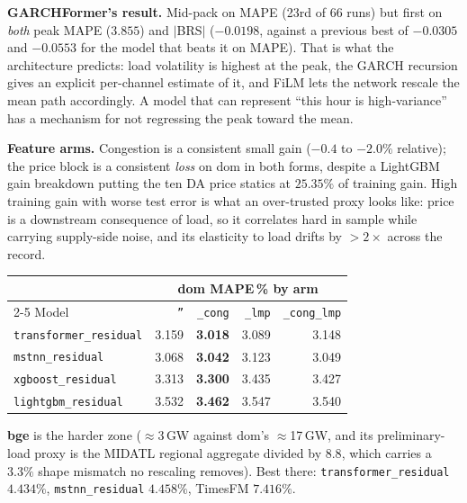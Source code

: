 \documentclass[11pt]{article}
\newcommand{\code}[1]{\texttt{\small #1}}
\begin{document}
\noindent
\textbf{GARCHFormer's result.} Mid-pack on MAPE (23rd of 66 runs) but first on
\emph{both} peak MAPE ($3.855$) and $|$BRS$|$ ($-0.0198$, against a previous best of
$-0.0305$ and $-0.0553$ for the model that beats it on MAPE). That is what the
architecture predicts: load volatility is highest at the peak, the GARCH recursion
gives an explicit per-channel estimate of it, and FiLM lets the network rescale the
mean path accordingly. A model that can represent ``this hour is high-variance'' has
a mechanism for not regressing the peak toward the mean.

\noindent
\textbf{Feature arms.} Congestion is a consistent small gain ($-0.4$ to $-2.0\%$
relative); the price block is a consistent \emph{loss} on dom in both forms, despite
a LightGBM gain breakdown putting the ten DA price statics at $25.35\%$ of training
gain. High training gain with worse test error is what an over-trusted proxy looks
like: price is a downstream consequence of load, so it correlates hard in sample
while carrying supply-side noise, and its elasticity to load drifts by ${>}2\times$
across the record.

\begin{center}\small
\begin{tabular}{@{}lrrrr@{}}
\toprule
& \multicolumn{4}{c}{dom MAPE\,\% by arm} \\
\cmidrule(l){2-5}
Model & \code{''} & \code{\_cong} & \code{\_lmp} & \code{\_cong\_lmp} \\
\midrule
\code{transformer\_residual} & 3.159 & \textbf{3.018} & 3.089 & 3.148 \\
\code{mstnn\_residual}       & 3.068 & \textbf{3.042} & 3.123 & 3.049 \\
\code{xgboost\_residual}     & 3.313 & \textbf{3.300} & 3.435 & 3.427 \\
\code{lightgbm\_residual}    & 3.532 & \textbf{3.462} & 3.547 & 3.540 \\
\bottomrule
\end{tabular}
\end{center}

\noindent
\textbf{bge} is the harder zone ($\approx$3\,GW against dom's $\approx$17\,GW, and
its preliminary-load proxy is the MIDATL regional aggregate divided by $8.8$, which
carries a $3.3\%$ shape mismatch no rescaling removes). Best there:
\code{transformer\_residual} $4.434\%$, \code{mstnn\_residual} $4.458\%$, TimesFM
$7.416\%$.
\end{document}
